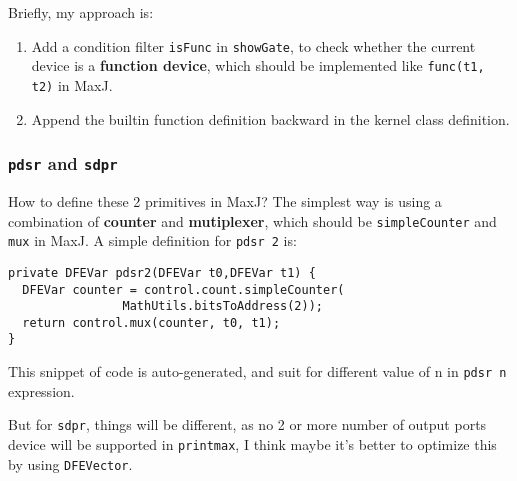 Briefly, my approach is:
\begin{enumerate}
\item Add a condition filter \texttt{isFunc} in \texttt{showGate}, to check whether the current device is a \textbf{function device}, which should be implemented like \texttt{func(t1, t2)} in MaxJ. 
\item Append the builtin function definition backward in the kernel class definition. 
\end{enumerate}

\subsubsection{\texttt{pdsr} and \texttt{sdpr}}
How to define these 2 primitives in MaxJ? The simplest way is using a combination of \textbf{counter} and \textbf{mutiplexer}, which should be \texttt{simpleCounter} and \texttt{mux} in MaxJ. A simple definition for \texttt{pdsr 2} is:

\begin{lstlisting}
private DFEVar pdsr2(DFEVar t0,DFEVar t1) {
  DFEVar counter = control.count.simpleCounter(
    			MathUtils.bitsToAddress(2));
  return control.mux(counter, t0, t1);
}
\end{lstlisting}

This snippet of code is auto-generated, and suit for different value of n in \texttt{pdsr n} expression.

But for \texttt{sdpr}, things will be different, as no 2 or more number of output ports device will be supported in \texttt{printmax}, I think maybe it's better to optimize this by using \texttt{DFEVector}.
